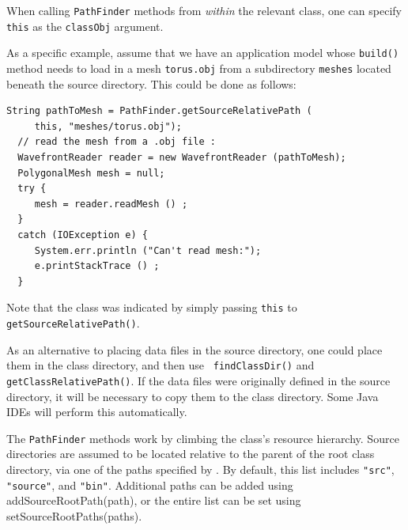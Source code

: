 \begin{sideblock}
When calling {\tt PathFinder} methods from {\it within} the relevant
class, one can specify {\tt this} as the {\tt classObj} argument.
\end{sideblock}

As a specific example, assume that we have an application model whose
{\tt build()} method needs to load in a mesh {\tt torus.obj} from a
subdirectory {\tt meshes} located beneath the source directory. This
could be done as follows:
%
\begin{lstlisting}[]
  String pathToMesh = PathFinder.getSourceRelativePath (
     this, "meshes/torus.obj");
  // read the mesh from a .obj file :
  WavefrontReader reader = new WavefrontReader (pathToMesh);
  PolygonalMesh mesh = null;
  try {
     mesh = reader.readMesh () ;
  }
  catch (IOException e) {
     System.err.println ("Can't read mesh:");
     e.printStackTrace () ;
  }
\end{lstlisting}
Note that the class was indicated by simply passing {\tt this} to {\tt
getSourceRelativePath()}.

\begin{sideblock}
As an alternative to placing data files in the source directory, one
could place them in the class directory, and then use {\tt
findClassDir()} and {\tt getClassRelativePath()}. If the data files
were originally defined in the source directory, it will be necessary
to copy them to the class directory. Some Java IDEs will perform this
automatically.
\end{sideblock}

The {\tt PathFinder} methods work by climbing the class's resource
hierarchy.  Source directories are assumed to be located relative to
the parent of the root class directory, via one of the paths specified
by . By default, this
list includes {\tt "src"}, {\tt "source"}, and {\tt "bin"}. Additional
paths can be added using
%
{addSourceRootPath(path)},
or the entire list can be set using
%
{setSourceRootPaths(paths)}.
